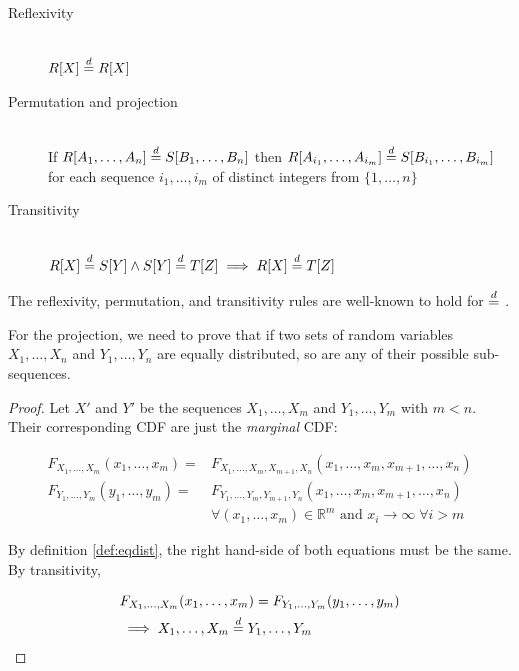 \begin{description}
    \item[Reflexivity] \hfill \\
        $R[X] \stackrel{d}{=} R[X]$
    \item[Permutation and projection] \hfill \\
        If $R[A_1,\dots,A_n] \stackrel{d}{=} S[B_1,\dots,B_n]$ then
        $R[A_{i_1},\dots,A_{i_m}] \stackrel{d}{=} S[B_{i_1},\dots,B_{i_m}]$ for each sequence
        $i_1,\dots,i_m$ of distinct integers from $\{1,\dots,n\}$
    \item[Transitivity] \hfill \\
        $ R[X] \stackrel{d}{=} S[Y] \land S[Y] \stackrel{d}{=} T[Z] \implies R[X] \stackrel{d}{=} T[Z]$
\end{description}

The reflexivity, permutation, and transitivity rules are well-known to hold
for $\stackrel{d}{=}$ \cite{randles1979introduction}.

For the projection, we need to prove that if two sets of random variables
$X_1,\dots,X_n$ and $Y_1,\dots,Y_n$ are equally distributed, so are
any of their possible sub-sequences.

\begin{proof}
Let $X'$ and $Y'$ be the sequences $X_1,\dots,X_m$ and $Y_1,\dots,Y_m$ with $m < n$.
Their corresponding  \gls{CDF} are just the \emph{marginal} \gls{CDF}:

\begin{equation}
\begin{split}
    F_{X_1,\dots,X_m}(x_1,\dots,x_m) = & F_{X_1,\dots,X_m,X_{m+1},X_n}(x_1,\dots,x_m,x_{m+1},\dots,x_n) \\
    F_{Y_1,\dots,Y_m}(y_1,\dots,y_m) =& F_{Y_1,\dots,Y_m,Y_{m+1},Y_n}(x_1,\dots,x_m,x_{m+1},\dots,x_n)\\
    & \forall (x_1,\dots,x_m) \in \mathbb{R}^m \textrm{ and } x_i \xrightarrow{} \infty \; \forall i > m
\end{split}
\end{equation}

By definition \ref{def:eqdist}, the right hand-side of both equations must be the same.
By transitivity, 

\begin{equation}
\begin{split}
    & F_{X_1,\dots,X_m}(x_1,\dots,x_m) = F_{Y_1,\dots,Y_m}(y_1,\dots,y_m) \\
    & \implies X_1,\dots,X_m \stackrel{d}{=} Y_1,\dots,Y_m
\end{split}
\end{equation}

\end{proof}

